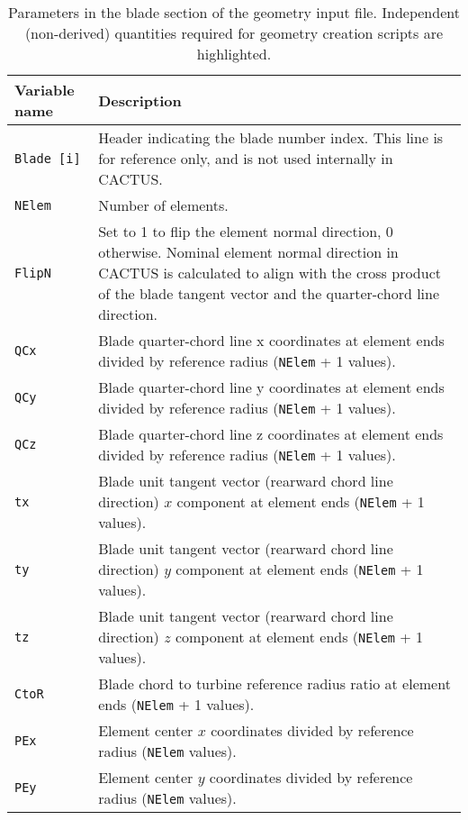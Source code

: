 \begin{longtable}{p{}p{}}
\caption{Parameters in the blade section of the geometry input file. Independent (non-derived) quantities required for geometry creation scripts are highlighted.} \label{tbl:geometry_input_params_blade} \\
\toprule
Variable name & Description \\ \midrule
\texttt{Blade [i]} & Header indicating the blade number index. This line is for reference only, and is not used internally in CACTUS. \\
\rowcolor{highlightcolor}\texttt{NElem}   & Number of elements. \\
\rowcolor{highlightcolor}\texttt{FlipN}   & Set to 1 to flip the element normal direction, 0 otherwise. Nominal element normal direction in CACTUS is calculated to align with the cross product of the blade tangent vector and the quarter-chord line direction. \\
\rowcolor{highlightcolor}\texttt{QCx}     & Blade quarter-chord line x coordinates at element ends divided by reference radius (\texttt{NElem} + 1 values). \\
\rowcolor{highlightcolor}\texttt{QCy}     & Blade quarter-chord line y coordinates at element ends divided by reference radius (\texttt{NElem} + 1 values). \\
\rowcolor{highlightcolor}\texttt{QCz}     & Blade quarter-chord line z coordinates at element ends divided by reference radius (\texttt{NElem} + 1 values). \\
\rowcolor{highlightcolor}\texttt{tx}      & Blade unit tangent vector (rearward chord line direction) $x$ component at element ends (\texttt{NElem} + 1 values). \\
\rowcolor{highlightcolor}\texttt{ty}      & Blade unit tangent vector (rearward chord line direction) $y$ component at element ends (\texttt{NElem} + 1 values). \\
\rowcolor{highlightcolor}\texttt{tz}      & Blade unit tangent vector (rearward chord line direction) $z$ component at element ends (\texttt{NElem} + 1 values). \\
\rowcolor{highlightcolor}\texttt{CtoR}    & Blade chord to turbine reference radius ratio at element ends (\texttt{NElem} + 1 values). \\
\texttt{PEx}     & Element center $x$ coordinates divided by reference radius (\texttt{NElem} values). \\
\texttt{PEy}     & Element center $y$ coordinates divided by reference radius (\texttt{NElem} values). \\

\end{longtable}
